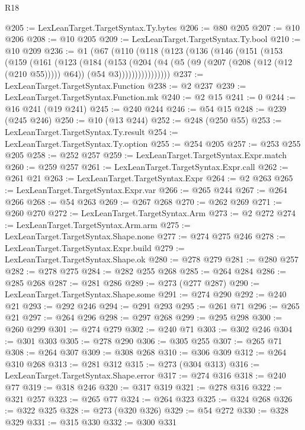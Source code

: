 \begin{lexlean}{R18}
\begin{coremodule}
@205 := LexLeanTarget.TargetSyntax.Ty.bytes
@206 := @80 @205
@207 := @10 @206
@208 := @10 @205
@209 := LexLeanTarget.TargetSyntax.Ty.bool
@210 := @10 @209
@236 := @1
    (@67
      (@110
        (@118
          (@123
            (@136
              (@146
                (@151
                  (@153
                    (@159
                      (@161
                        (@123
                          (@184
                            (@153
                              (@204
                                (@4
                                  (@5 (@9 (@207 (@208 (@12 (@12 (@210 @55))))) @64))
                                  (@54 @3))))))))))))))))
@237 := LexLeanTarget.TargetSyntax.Function
@238 := @2 @237
@239 := LexLeanTarget.TargetSyntax.Function.mk
@240 := @2 @15
@241 := 0
@244 := @16 @241 (@19 @241)
@245 := @240 @244
@246 := @54 @15
@248 := @239 (@245 @246)
@250 := @10 (@13 @244)
@252 := @248 (@250 @55)
@253 := LexLeanTarget.TargetSyntax.Ty.result
@254 := LexLeanTarget.TargetSyntax.Ty.option
@255 := @254 @205
@257 := @253 @255 @205
@258 := @252 @257
@259 := LexLeanTarget.TargetSyntax.Expr.match
@260 := @259 @257
@261 := LexLeanTarget.TargetSyntax.Expr.call
@262 := @261 @21
@263 := LexLeanTarget.TargetSyntax.Expr
@264 := @2 @263
@265 := LexLeanTarget.TargetSyntax.Expr.var
@266 := @265 @244
@267 := @264 @266
@268 := @54 @263
@269 := @267 @268
@270 := @262 @269
@271 := @260 @270
@272 := LexLeanTarget.TargetSyntax.Arm
@273 := @2 @272
@274 := LexLeanTarget.TargetSyntax.Arm.arm
@275 := LexLeanTarget.TargetSyntax.Shape.none
@277 := @274 @275 @246
@278 := LexLeanTarget.TargetSyntax.Expr.build
@279 := LexLeanTarget.TargetSyntax.Shape.ok
@280 := @278 @279
@281 := @280 @257
@282 := @278 @275
@284 := @282 @255 @268
@285 := @264 @284
@286 := @285 @268
@287 := @281 @286
@289 := @273 (@277 @287)
@290 := LexLeanTarget.TargetSyntax.Shape.some
@291 := @274 @290
@292 := @240 @21
@293 := @292 @246
@294 := @291 @293
@295 := @261 @71
@296 := @265 @21
@297 := @264 @296
@298 := @297 @268
@299 := @295 @298
@300 := @260 @299
@301 := @274 @279
@302 := @240 @71
@303 := @302 @246
@304 := @301 @303
@305 := @278 @290
@306 := @305 @255
@307 := @265 @71
@308 := @264 @307
@309 := @308 @268
@310 := @306 @309
@312 := @264 @310 @268
@313 := @281 @312
@315 := @273 (@304 @313)
@316 := LexLeanTarget.TargetSyntax.Shape.error
@317 := @274 @316
@318 := @240 @77
@319 := @318 @246
@320 := @317 @319
@321 := @278 @316
@322 := @321 @257
@323 := @265 @77
@324 := @264 @323
@325 := @324 @268
@326 := @322 @325
@328 := @273 (@320 @326)
@329 := @54 @272
@330 := @328 @329
@331 := @315 @330
@332 := @300 @331

\end{coremodule}
\end{lexlean}
